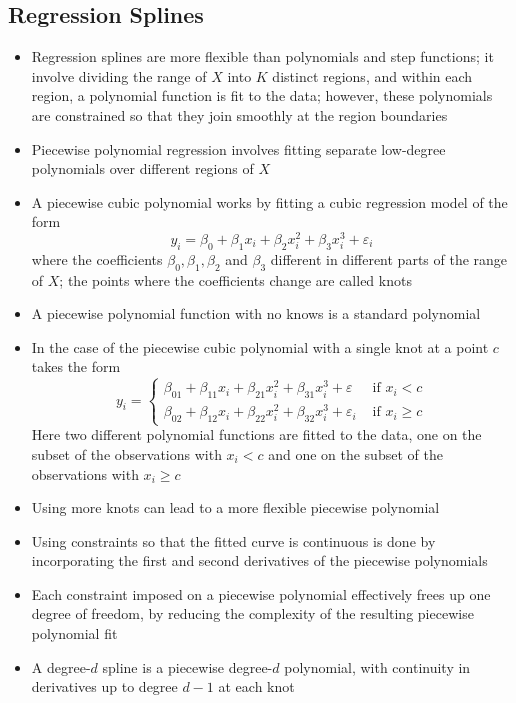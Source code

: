 \documentclass[12pt]{article}
\begin{document}
\subsection{Regression Splines}
\begin{itemize} 
\item Regression splines are more flexible than polynomials and step functions; it involve dividing the range of $X$ into $K$ distinct regions, and within each region, a polynomial function is fit to the data; however, these polynomials are constrained so that they join smoothly at the region boundaries
\item Piecewise polynomial regression involves fitting separate low-degree polynomials over different regions of $X$
\item A piecewise cubic polynomial works by fitting a cubic regression model of the form $$ y_i = \beta_0 + \beta_1x_i + \beta_2x^2_i + \beta_3x^3_i + \varepsilon_i $$ where the coefficients $\beta_0,\beta_1,\beta_2$ and $\beta_3$ different in different parts of the range of $X$; the points where the coefficients change are called knots 
\item A piecewise polynomial function with no knows is a standard polynomial
\item In the case of the piecewise cubic polynomial with a single knot at a point $c$ takes the form $$ y_i = \begin{cases} \beta_{01} + \beta_{11}x_i + \beta_{21}x_i^2 + \beta_{31}x_i^3 + \varepsilon &\text{ if } x_i < c \\ \beta_{02} + \beta_{12}x_i + \beta_{22}x_i^2 + \beta_{32}x_i^3 + \varepsilon_i &\text{ if } x_ i \geq c \end{cases} $$ 
Here two different polynomial functions are fitted to the data, one on the subset of the observations with $x_i < c$ and one on the subset of the observations with $x_i \geq c$
\item Using more knots can lead to a more flexible piecewise polynomial
\item Using constraints so that the fitted curve is continuous is done by incorporating the first and second derivatives of the piecewise polynomials
\item Each constraint imposed on a piecewise polynomial effectively frees up one degree of freedom, by reducing the complexity of the resulting piecewise polynomial fit
\item A degree-$d$ spline is a piecewise degree-$d$ polynomial, with continuity in derivatives up to degree $d-1$ at each knot 

\end{itemize}
\end{document}
